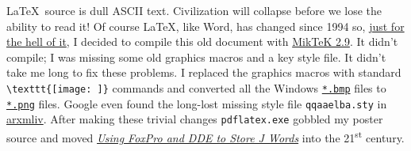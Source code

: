 \LaTeX\ source is dull ASCII text. Civilization will collapse
before we lose the ability to read it! Of course \LaTeX, like
Word, has changed since 1994 so,
\href{http://www.youtube.com/watch?v=RK9sO7Cjy-8}{just for the hell of
it}, I decided to compile this old document with
\href{http://miktex.org/}{MikTeK 2.9}. It didn't compile; I was missing
some old graphics macros and a key style file. It didn't take me long to
fix these problems. I replaced the graphics macros with standard
\verb|\texttt{[image: ]}| commands and converted all the
Windows \href{http://www.fileinfo.com/extension/bmp}{\texttt{*.bmp}} files to
\href{http://www.fileinfo.com/extension/png}{\texttt{*.png}} files. Google even
found the long-lost missing style file \texttt{qqaaelba.sty}
in \href{http://arxmliv.kwarc.info/}{arxmliv}. After making these
trivial changes \texttt{pdflatex.exe} gobbled my poster source and moved
\href{https://github.com/bakerjd99/joddoc/blob/master/history/JDICT.pdf}{\emph{Using
FoxPro and DDE to Store J Words}} into the 21\textsuperscript{st} century.




%